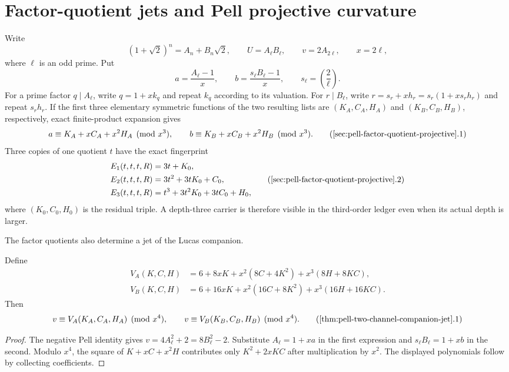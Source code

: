 \section{Factor-quotient jets and Pell projective curvature}
\label{sec:pell-factor-quotient-projective}

Write
\[
 (1+\sqrt2)^n=A_n+B_n\sqrt2,\qquad
 U=A_\ell B_\ell,\qquad v=2A_{2\ell},\qquad x=2\ell,
\]
where $\ell$ is an odd prime.  Put
\[
 a=\frac{A_\ell-1}{x},\qquad
 b=\frac{s_\ell B_\ell-1}{x},\qquad
 s_\ell=\left(\frac2\ell\right).
\]
For a prime factor $q\mid A_\ell$, write $q=1+xk_q$ and repeat $k_q$
according to its valuation.  For $r\mid B_\ell$, write
$r=s_r+xh_r=s_r(1+xs_rh_r)$ and repeat $s_rh_r$.  If the first three
elementary symmetric functions of the two resulting lists are
$(K_A,C_A,H_A)$ and $(K_B,C_B,H_B)$, respectively, exact finite-product
expansion gives
\[
 a\equiv K_A+xC_A+x^2H_A\pmod{x^3},\qquad
 b\equiv K_B+xC_B+x^2H_B\pmod{x^3}.                    \tag{\ref{sec:pell-factor-quotient-projective}.1}
\]
Three copies of one quotient $t$ have the exact fingerprint
\[
\begin{aligned}
 E_1(t,t,t,R)&=3t+K_0,\\
 E_2(t,t,t,R)&=3t^2+3tK_0+C_0,\\
 E_3(t,t,t,R)&=t^3+3t^2K_0+3tC_0+H_0,
\end{aligned}                                           \tag{\ref{sec:pell-factor-quotient-projective}.2}
\]
where $(K_0,C_0,H_0)$ is the residual triple.  A depth-three carrier is
therefore visible in the third-order ledger even when its actual depth is
larger.

The factor quotients also determine a jet of the Lucas companion.

\begin{theorem}
\label{thm:pell-two-channel-companion-jet}
Define
\[
\begin{aligned}
 V_A(K,C,H)&=6+8xK+x^2(8C+4K^2)+x^3(8H+8KC),\\
 V_B(K,C,H)&=6+16xK+x^2(16C+8K^2)+x^3(16H+16KC).
\end{aligned}
\]
Then
\[
 v\equiv V_A(K_A,C_A,H_A)\pmod{x^4},\qquad
 v\equiv V_B(K_B,C_B,H_B)\pmod{x^4}.                  \tag{\ref{thm:pell-two-channel-companion-jet}.1}
\]
\end{theorem}

\begin{proof}
The negative Pell identity gives
$v=4A_\ell^2+2=8B_\ell^2-2$.  Substitute
$A_\ell=1+xa$ in the first expression and
$s_\ell B_\ell=1+xb$ in the second.  Modulo $x^4$, the square of
$K+xC+x^2H$ contributes only $K^2+2xKC$ after multiplication by $x^2$.
The displayed polynomials follow by collecting coefficients.
\end{proof}

